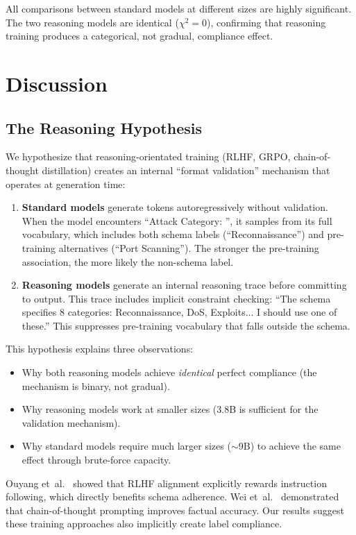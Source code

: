 \documentclass[review,3p]{elsarticle}
\begin{document}
All comparisons between standard models at different sizes are highly significant. The two reasoning models are identical ($\chi^2 = 0$), confirming that reasoning training produces a categorical, not gradual, compliance effect.

\section{Discussion}

\subsection{The Reasoning Hypothesis}

We hypothesize that reasoning-orientated training (RLHF, GRPO, chain-of-thought distillation) creates an internal ``format validation'' mechanism that operates at generation time:

\begin{enumerate}
\item \textbf{Standard models} generate tokens autoregressively without validation. When the model encounters ``Attack Category: '', it samples from its full vocabulary, which includes both schema labels (``Reconnaissance'') and pre-training alternatives (``Port Scanning''). The stronger the pre-training association, the more likely the non-schema label.
\item \textbf{Reasoning models} generate an internal reasoning trace before committing to output. This trace includes implicit constraint checking: ``The schema specifies 8 categories: Reconnaissance, DoS, Exploits... I should use one of these.'' This suppresses pre-training vocabulary that falls outside the schema.
\end{enumerate}

This hypothesis explains three observations:
\begin{itemize}
\item Why both reasoning models achieve \emph{identical} perfect compliance (the mechanism is binary, not gradual).
\item Why reasoning models work at smaller sizes (3.8B is sufficient for the validation mechanism).
\item Why standard models require much larger sizes ($\sim$9B) to achieve the same effect through brute-force capacity.
\end{itemize}

Ouyang et~al.~\cite{ouyang2022} showed that RLHF alignment explicitly rewards instruction following, which directly benefits schema adherence. Wei et~al.~\cite{wei2022} demonstrated that chain-of-thought prompting improves factual accuracy. Our results suggest these training approaches also implicitly create label compliance.
\end{document}
